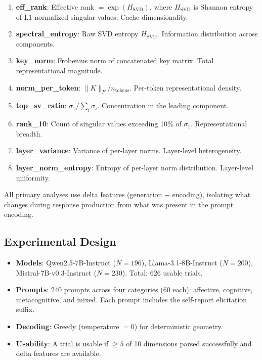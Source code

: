 \documentclass[11pt,a4paper]{article}
\begin{document}
\begin{enumerate}[nosep]
    \item \textbf{eff\_rank}: Effective rank $= \exp(H_{\text{SVD}})$, where $H_{\text{SVD}}$ is Shannon entropy of L1-normalized singular values. Cache dimensionality.
    \item \textbf{spectral\_entropy}: Raw SVD entropy $H_{\text{SVD}}$. Information distribution across components.
    \item \textbf{key\_norm}: Frobenius norm of concatenated key matrix. Total representational magnitude.
    \item \textbf{norm\_per\_token}: $\|K\|_F / n_{\text{tokens}}$. Per-token representational density.
    \item \textbf{top\_sv\_ratio}: $\sigma_1 / \sum_i \sigma_i$. Concentration in the leading component.
    \item \textbf{rank\_10}: Count of singular values exceeding 10\% of $\sigma_1$. Representational breadth.
    \item \textbf{layer\_variance}: Variance of per-layer norms. Layer-level heterogeneity.
    \item \textbf{layer\_norm\_entropy}: Entropy of per-layer norm distribution. Layer-level uniformity.
\end{enumerate}

All primary analyses use delta features (generation $-$ encoding), isolating what changes during response production from what was present in the prompt encoding.

\subsection{Experimental Design}

\begin{itemize}[nosep]
    \item \textbf{Models}: Qwen2.5-7B-Instruct ($N = 196$), Llama-3.1-8B-Instruct ($N = 200$), Mistral-7B-v0.3-Instruct ($N = 230$). Total: 626 usable trials.
    \item \textbf{Prompts}: 240 prompts across four categories (60 each): affective, cognitive, metacognitive, and mixed. Each prompt includes the self-report elicitation suffix.
    \item \textbf{Decoding}: Greedy (temperature $= 0$) for deterministic geometry.
    \item \textbf{Usability}: A trial is usable if $\geq 5$ of 10 dimensions parsed successfully and delta features are available.
\end{itemize}
\end{document}
